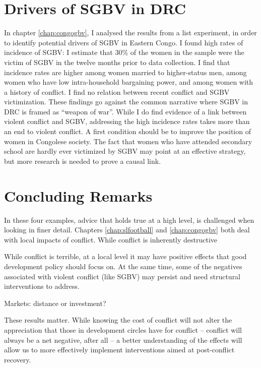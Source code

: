 \section{Drivers of SGBV in DRC}
In chapter \ref{chap:congogbv}, I analysed the results from a list experiment, in order to identify potential drivers of SGBV in Eastern Congo. I found high rates of incidence of SGBV: I estimate that 30\% of the women in the sample were the victim of SGBV in the twelve months prior to data collection. I find that incidence rates are higher among women married to higher-status men, among women who have low intra-household bargaining power, and among women with a history of conflict. I find no relation between recent conflict and SGBV victimization. These findings go against the common narrative where SGBV in DRC is framed as ``weapon of war''. While I do find evidence of a link between violent conflict and SGBV, addressing the high incidence rates takes more than an end to violent conflict. A first condition should be to improve the position of women in Congolese society. The fact that women who have attended secondary school are hardly ever victimized by SGBV may point at an effective strategy, but more research is needed to prove a causal link.



\section{Concluding Remarks}
In these four examples, advice that holds true at a high level, is challenged when looking in finer detail. Chapters \ref{chap:slfootball} and \ref{chap:congogbv} both deal with local impacts of conflict. While conflict is inherently destructive 

While conflict is terrible, at a local level it may have positive effects that good development policy should focus on. At the same time, some of the negatives associated with violent conflict (like SGBV) may persist and need structural interventions to address. 

%
Markets: distance or investment?



These results matter. While knowing the cost of conflict will not alter the appreciation that those in development circles have for conflict -- conflict will always be a net negative, after all -- a better understanding of the effects will allow us to more effectively implement interventions aimed at post-conflict recovery. 





%